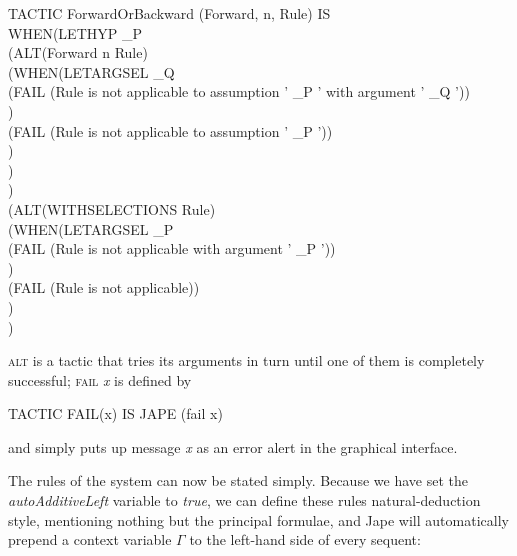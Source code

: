 \documentclass[11pt]{book}
\newcommand{\tab}{\hspace{5mm}}
\begin{document}
TACTIC ForwardOrBackward (Forward, n, Rule) IS \\
\tab WHEN\tab (LETHYP \_P \\
\tab \tab \tab (ALT\tab (Forward n Rule)\\
\tab \tab \tab \tab (WHEN\tab (LETARGSEL \_Q \\
\tab \tab \tab \tab \tab \tab (FAIL (Rule is not applicable to assumption ' \_P ' with argument ' \_Q '))\\
\tab \tab \tab \tab \tab )\\
\tab \tab \tab \tab \tab (FAIL (Rule is not applicable to assumption ' \_P '))\\
\tab \tab \tab \tab )\\
\tab \tab \tab )\\
\tab \tab )\\
\tab \tab (ALT\tab (WITHSELECTIONS Rule)\\
\tab \tab \tab (WHEN\tab (LETARGSEL \_P\\
\tab \tab \tab \tab \tab (FAIL (Rule is not applicable with argument ' \_P '))\\
\tab \tab \tab \tab )\\
\tab \tab \tab \tab (FAIL (Rule is not applicable))\\
\tab \tab \tab )\\
\tab \tab )


\textsc{alt} is a tactic that tries its arguments in turn until one of them is completely successful; \textsc{fail} \textit{x} is defined by

TACTIC FAIL(x) IS JAPE (fail x)


and simply puts up message \textit{x} as an error alert in the graphical interface.


The rules of the system can now be stated simply. Because we have set the \textit{autoAdditiveLeft} variable to \textit{true}, we can define these rules natural-deduction style, mentioning nothing but the principal formulae, and Jape will automatically prepend a context variable \ensuremath{\Gamma} to the left-hand side of every sequent:
\end{document}
